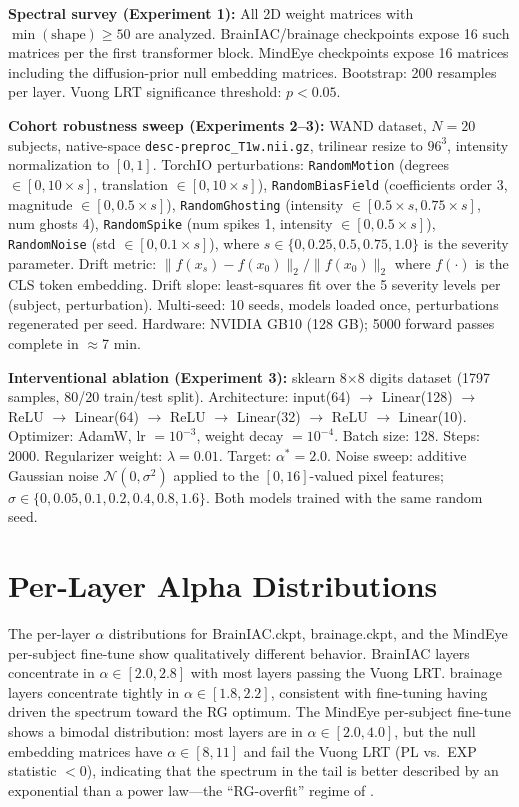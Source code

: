 \documentclass{article} %
\theoremstyle{plain}
\theoremstyle{definition}
\theoremstyle{remark}
\begin{document}
\textbf{Spectral survey (Experiment 1):} All 2D weight matrices with $\min(\text{shape}) \geq 50$ are analyzed. BrainIAC/brainage checkpoints expose 16 such matrices per the first transformer block. MindEye checkpoints expose 16 matrices including the diffusion-prior null embedding matrices. Bootstrap: 200 resamples per layer. Vuong LRT significance threshold: $p < 0.05$.

\textbf{Cohort robustness sweep (Experiments 2--3):} WAND dataset, $N=20$ subjects, native-space \texttt{desc-preproc\_T1w.nii.gz}, trilinear resize to $96^3$, intensity normalization to $[0,1]$. TorchIO perturbations: \texttt{RandomMotion} (degrees $\in [0, 10 \times s]$, translation $\in [0, 10 \times s]$), \texttt{RandomBiasField} (coefficients order 3, magnitude $\in [0, 0.5 \times s]$), \texttt{RandomGhosting} (intensity $\in [0.5 \times s, 0.75 \times s]$, num ghosts 4), \texttt{RandomSpike} (num spikes 1, intensity $\in [0, 0.5 \times s]$), \texttt{RandomNoise} (std $\in [0, 0.1 \times s]$), where $s \in \{0, 0.25, 0.5, 0.75, 1.0\}$ is the severity parameter. Drift metric: $\|f(x_s) - f(x_0)\|_2 / \|f(x_0)\|_2$ where $f(\cdot)$ is the CLS token embedding. Drift slope: least-squares fit over the 5 severity levels per (subject, perturbation). Multi-seed: 10 seeds, models loaded once, perturbations regenerated per seed. Hardware: NVIDIA GB10 (128 GB); 5000 forward passes complete in $\approx$7 min.

\textbf{Interventional ablation (Experiment 3):} sklearn 8$\times$8 digits dataset (1797 samples, 80/20 train/test split). Architecture: input(64) $\to$ Linear(128) $\to$ ReLU $\to$ Linear(64) $\to$ ReLU $\to$ Linear(32) $\to$ ReLU $\to$ Linear(10). Optimizer: AdamW, lr $= 10^{-3}$, weight decay $= 10^{-4}$. Batch size: 128. Steps: 2000. Regularizer weight: $\lambda = 0.01$. Target: $\alpha^* = 2.0$. Noise sweep: additive Gaussian noise $\mathcal{N}(0, \sigma^2)$ applied to the $[0,16]$-valued pixel features; $\sigma \in \{0, 0.05, 0.1, 0.2, 0.4, 0.8, 1.6\}$. Both models trained with the same random seed.

\section{Per-Layer Alpha Distributions}
\label{sec:appendix_perlayer}

The per-layer $\alpha$ distributions for BrainIAC.ckpt, brainage.ckpt, and the MindEye per-subject fine-tune show qualitatively different behavior. BrainIAC layers concentrate in $\alpha \in [2.0, 2.8]$ with most layers passing the Vuong LRT. brainage layers concentrate tightly in $\alpha \in [1.8, 2.2]$, consistent with fine-tuning having driven the spectrum toward the RG optimum. The MindEye per-subject fine-tune shows a bimodal distribution: most layers are in $\alpha \in [2.0, 4.0]$, but the null embedding matrices have $\alpha \in [8, 11]$ and fail the Vuong LRT (PL vs.\ EXP statistic $< 0$), indicating that the spectrum in the tail is better described by an exponential than a power law---the ``RG-overfit'' regime of \citet{martin2026rg}.
\end{document}
